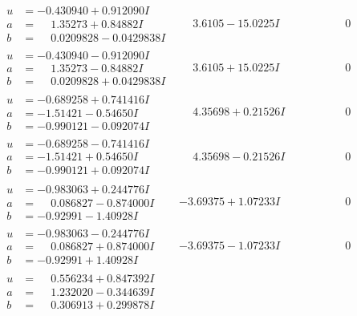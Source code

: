 \documentclass[1p]{elsarticle_modified}
\theoremstyle{definition}
\begin{document}
$$\begin{array}{c|c|c}
\begin{aligned}
u &= -0.430940 + 0.912090 I \\
a &= \phantom{-}1.35273 + 0.84882 I \\
b &= \phantom{-}0.0209828 - 0.0429838 I\end{aligned}
 & \phantom{-}3.6105 - 15.0225 I & \phantom{-0.000000 } 0 \\ \hline\begin{aligned}
u &= -0.430940 - 0.912090 I \\
a &= \phantom{-}1.35273 - 0.84882 I \\
b &= \phantom{-}0.0209828 + 0.0429838 I\end{aligned}
 & \phantom{-}3.6105 + 15.0225 I & \phantom{-0.000000 } 0 \\ \hline\begin{aligned}
u &= -0.689258 + 0.741416 I \\
a &= -1.51421 - 0.54650 I \\
b &= -0.990121 - 0.092074 I\end{aligned}
 & \phantom{-}4.35698 + 0.21526 I & \phantom{-0.000000 } 0 \\ \hline\begin{aligned}
u &= -0.689258 - 0.741416 I \\
a &= -1.51421 + 0.54650 I \\
b &= -0.990121 + 0.092074 I\end{aligned}
 & \phantom{-}4.35698 - 0.21526 I & \phantom{-0.000000 } 0 \\ \hline\begin{aligned}
u &= -0.983063 + 0.244776 I \\
a &= \phantom{-}0.086827 - 0.874000 I \\
b &= -0.92991 - 1.40928 I\end{aligned}
 & -3.69375 + 1.07233 I & \phantom{-0.000000 } 0 \\ \hline\begin{aligned}
u &= -0.983063 - 0.244776 I \\
a &= \phantom{-}0.086827 + 0.874000 I \\
b &= -0.92991 + 1.40928 I\end{aligned}
 & -3.69375 - 1.07233 I & \phantom{-0.000000 } 0 \\ \hline\begin{aligned}
u &= \phantom{-}0.556234 + 0.847392 I \\
a &= \phantom{-}1.232020 - 0.344639 I \\
b &= \phantom{-}0.306913 + 0.299878 I\end{aligned}

\end{array}$$
\end{document}
